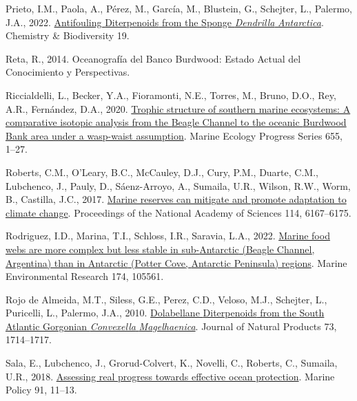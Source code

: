 \documentclass[preprint, 3p,
authoryear]{elsarticle} %
\newlength{\cslhangindent}
\newlength{\cslentryspacingunit} %
\newenvironment{CSLReferences}[2] %
 {%
  \setlength{\parindent}{0pt}
  \ifodd #1
  \let\oldpar\par
  \def\par{\hangindent=\cslhangindent\oldpar}
  \fi
  \setlength{\parskip}{#2\cslentryspacingunit}
 }%
 {}
\begin{document}
\begin{CSLReferences}{1}{0}
\leavevmode{}%
Prieto, I.M., Paola, A., Pérez, M., García, M., Blustein, G., Schejter,
L., Palermo, J.A., 2022.
\href{https://doi.org/10.1002/cbdv.202100618}{Antifouling {Diterpenoids}
from the {Sponge} {\emph{Dendrilla}}{ \emph{Antarctica}}}. Chemistry \&
Biodiversity 19.

\leavevmode{}%
Reta, R., 2014. Oceanografía del {Banco Burdwood}: {Estado Actual} del
{Conocimiento} y {Perspectivas}.

\leavevmode{}%
Riccialdelli, L., Becker, Y.A., Fioramonti, N.E., Torres, M., Bruno,
D.O., Rey, A.R., Fernández, D.A., 2020.
\href{https://doi.org/10.3354/meps13524}{Trophic structure of southern
marine ecosystems: A comparative isotopic analysis from the {Beagle
Channel} to the oceanic {Burdwood Bank} area under a wasp-waist
assumption}. Marine Ecology Progress Series 655, 1--27.

\leavevmode{}%
Roberts, C.M., O'Leary, B.C., McCauley, D.J., Cury, P.M., Duarte, C.M.,
Lubchenco, J., Pauly, D., Sáenz-Arroyo, A., Sumaila, U.R., Wilson, R.W.,
Worm, B., Castilla, J.C., 2017.
\href{https://doi.org/10.1073/pnas.1701262114}{Marine reserves can
mitigate and promote adaptation to climate change}. Proceedings of the
National Academy of Sciences 114, 6167--6175.

\leavevmode{}%
Rodriguez, I.D., Marina, T.I., Schloss, I.R., Saravia, L.A., 2022.
\href{https://doi.org/10.1016/j.marenvres.2022.105561}{Marine food webs
are more complex but less stable in sub-{Antarctic} ({Beagle Channel},
{Argentina}) than in {Antarctic} ({Potter Cove}, {Antarctic Peninsula})
regions}. Marine Environmental Research 174, 105561.

\leavevmode{}%
Rojo de Almeida, M.T., Siless, G.E., Perez, C.D., Veloso, M.J.,
Schejter, L., Puricelli, L., Palermo, J.A., 2010.
\href{https://doi.org/10.1021/np100337j}{Dolabellane {Diterpenoids} from
the {South Atlantic Gorgonian} {\emph{Convexella}}{
\emph{Magelhaenica}}}. Journal of Natural Products 73, 1714--1717.

\leavevmode{}%
Sala, E., Lubchenco, J., Grorud-Colvert, K., Novelli, C., Roberts, C.,
Sumaila, U.R., 2018.
\href{https://doi.org/10.1016/j.marpol.2018.02.004}{Assessing real
progress towards effective ocean protection}. Marine Policy 91, 11--13.


\end{CSLReferences}
\end{document}
